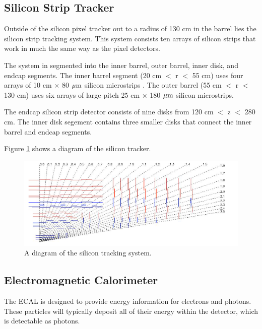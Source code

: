 \subsection{Silicon Strip Tracker}
Outside of the silicon pixel tracker out to a radius of 130 cm in the barrel lies the silicon strip tracking system.  
This system consists ten arrays of silicon strips that work in much the same way as the pixel detectors.  

The system in segmented into the inner barrel, outer barrel, inner disk, and endcap segments.  
The inner barrel segment (20 cm $<$ r $<$ 55 cm) uses four arrays of 10 cm $\times$ 80 $\mathrm{\mu m}$ silicon microstrips .  
The outer barrel (55 cm  $<$ r $<$ 130 cm) uses six arrays of large pitch 25 cm $\times$ 180 $\mathrm{\mu m}$ silicon microstrips.  

The endcap silicon strip detector consists of nine disks from 120 cm  $<$ z $<$ 280 cm.  
The inner disk segement contains three smaller disks that connect the inner barrel and endcap segments.  

Figure \ref{figs:CMStracker} shows a diagram of the silicon tracker.    

\begin{figure}
\begin{center}
\includegraphics[width=1.0\linewidth]{figs/CMStracker.png}
\caption{A diagram of the silicon tracking system.}
\label{figs:CMStracker}
\end{center}
\end{figure}
  


\subsection{Electromagnetic Calorimeter}
The ECAL is designed to provide energy information for electrons and photons.  
These particles will typically deposit all of their energy within the detector, which is detectable as photons. 

